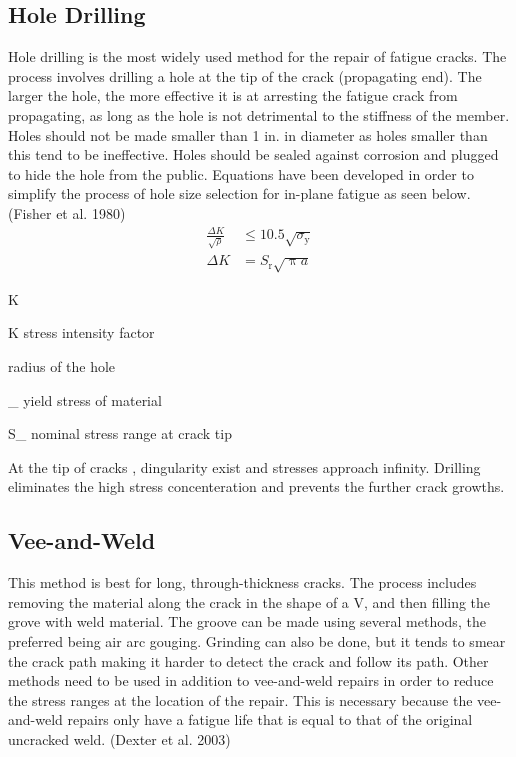 \subsection{Hole Drilling}

Hole drilling is the most widely used method for the repair of fatigue cracks. The process involves drilling a hole
at the tip of the crack (propagating end). The larger the hole, the more effective it is at arresting the fatigue crack
from propagating, as long as the hole is not detrimental to the stiffness of the member. Holes should not be made
smaller than 1 in. in diameter as holes smaller than this tend to be ineffective. Holes should be sealed against
corrosion and plugged to hide the hole from the public. Equations have been developed in order to simplify the
process of hole size selection for in-plane fatigue as seen below. (Fisher et al. 1980)
\begin{align}
  \frac{\Delta K}{\sqrt{\rho}} & \leqslant 10.5\sqrt{\sigma_\text{y}}\\
  \Delta K& = S_\text{r}\sqrt{\uppi a} 
\end{align}
\begin{EqDesc}{\Delta K}
  \item[\Delta K] stress intensity factor
  \item[\rho]radius of the hole
  \item[\sigma_\text{y}]yield stress of material
  \item[S_\text{r}]nominal stress range at crack tip
\end{EqDesc}

At the tip of cracks , dingularity exist and stresses approach infinity. Drilling eliminates the high stress concenteration and prevents the further crack growths.

\subsection{Vee-and-Weld}
This method is best for long, through-thickness cracks. The process includes removing the material along the
crack in the shape of a V, and then filling the grove with weld material. The groove can be made using several
methods, the preferred being air arc gouging. Grinding can also be done, but it tends to smear the crack path making it harder to detect the crack and follow its path. Other methods need to be used in addition to vee-and-weld repairs in
order to reduce the stress ranges at the location of the repair. This is necessary because the vee-and-weld repairs only
have a fatigue life that is equal to that of the original uncracked weld. (Dexter et al. 2003)

